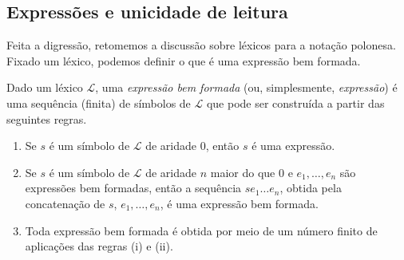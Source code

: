 \subsection{Expressões e unicidade de leitura}\label{subsec:expressoesEUnicidadeDeLeitura}
Feita a digressão, retomemos a discussão sobre léxicos para a notação polonesa.
Fixado um léxico, podemos definir o que é uma expressão bem formada.
\begin{metadefinition}\label{mdef:expressaoBemFormada}
Dado um léxico $\mathcal L$, uma \emph{expressão bem formada} (ou, simplesmente, \emph{expressão}) é uma sequência (finita) de símbolos de $\mathcal L$ que pode ser construída a partir das seguintes regras.
\begin{enumerate}[label=(\roman*)]
    \item Se $s$ é um símbolo de $\mathcal L$ de aridade $0$, então $s$ é uma expressão.
    \item Se $s$ é um símbolo de $\mathcal L$ de aridade $n$ maior do que $0$ e $e_1,\dots,e_n$ são expressões bem formadas, então a sequência $se_1\dots e_n$, obtida pela concatenação de $s$, $e_1,\dots,e_n$, é uma expressão bem formada.
    \item Toda expressão bem formada é obtida por meio de um número finito de aplicações das regras (i) e (ii).
\end{enumerate}
\end{metadefinition}

